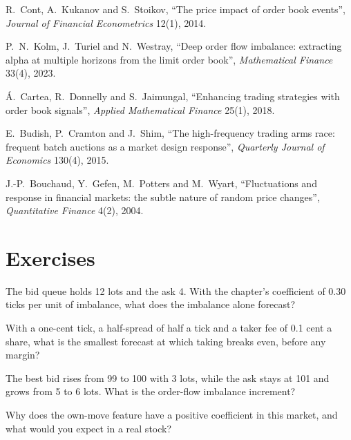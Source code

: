 \begin{omsources}
\item R.~Cont, A.~Kukanov and S.~Stoikov, ``The price impact of order book events'', \emph{Journal of Financial Econometrics} 12(1), 2014.
\item P.~N.~Kolm, J.~Turiel and N.~Westray, ``Deep order flow imbalance: extracting alpha at multiple horizons from the limit order book'',
\emph{Mathematical Finance} 33(4), 2023.
\item \'A.~Cartea, R.~Donnelly and S.~Jaimungal, ``Enhancing trading strategies with order book signals'', \emph{Applied Mathematical Finance} 25(1),
2018.
\item E.~Budish, P.~Cramton and J.~Shim, ``The high-frequency trading arms race: frequent batch auctions as a market design response'',
\emph{Quarterly Journal of Economics} 130(4), 2015.
\item J.-P.~Bouchaud, Y.~Gefen, M.~Potters and M.~Wyart, ``Fluctuations and response in financial markets: the subtle nature of random price
changes'', \emph{Quantitative Finance} 4(2), 2004.
\end{omsources}

\section{Exercises}

\begin{exercise}[$\star$]\label{exo:hf:short-horizon-alpha:1}
The bid queue holds 12 lots and the ask 4. With the chapter's coefficient of 0.30 ticks per unit of imbalance, what does the imbalance alone
forecast?
\end{exercise}

\begin{exercise}[$\star$]\label{exo:hf:short-horizon-alpha:2}
With a one-cent tick, a half-spread of half a tick and a taker fee of 0.1 cent a share, what is the smallest forecast at which taking breaks even,
before any margin?
\end{exercise}

\begin{exercise}[$\star$]\label{exo:hf:short-horizon-alpha:3}
The best bid rises from 99 to 100 with 3 lots, while the ask stays at 101 and grows from 5 to 6 lots. What is the order-flow imbalance increment?
\end{exercise}

\begin{exercise}[$\star\star$]\label{exo:hf:short-horizon-alpha:4}
Why does the own-move feature have a positive coefficient in this market, and what would you expect in a real stock?
\end{exercise}


